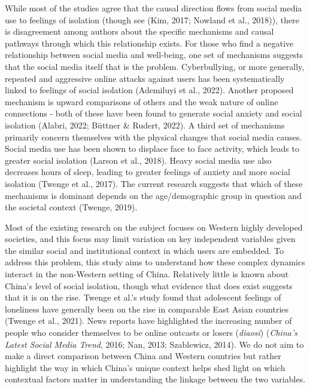 \documentclass[]{interact}
\theoremstyle{plain}%
\theoremstyle{definition}
\theoremstyle{remark}
\begin{document}
While most of the studies agree that the causal direction flows from
social media use to feelings of isolation (though see (Kim, 2017;
Nowland et al., 2018)), there is disagreement among authors about the
specific mechanisms and causal pathways through which this relationship
exists. For those who find a negative relationship between social media
and well-being, one set of mechanisms suggests that the social media
itself that is the problem. Cyberbullying, or more generally, repeated
and aggressive online attacks against users has been systematically
linked to feelings of social isolation (Ademiluyi et al., 2022). Another
proposed mechanism is upward comparisons of others and the weak nature
of online connections - both of these have been found to generate social
anxiety and social isolation (Alabri, 2022; Büttner \& Rudert, 2022). A
third set of mechanisms primarily concern themselves with the physical
changes that social media causes. Social media use has been shown to
displace face to face activity, which leads to greater social isolation
(Larson et al., 2018). Heavy social media use also decreases hours of
sleep, leading to greater feelings of anxiety and more social isolation
(Twenge et al., 2017). The current research suggests that which of these
mechanisms is dominant depends on the age/demographic group in question
and the societal context (Twenge, 2019).

Most of the existing research on the subject focuses on Western highly
developed societies, and this focus may limit variation on key
independent variables given the similar social and institutional context
in which users are embedded. To address this problem, this study aims to
understand how these complex dynamics interact in the non-Western
setting of China. Relatively little is known about China's level of
social isolation, though what evidence that does exist suggests that it
is on the rise. Twenge et al.'s study found that adolescent feelings of
loneliness have generally been on the rise in comparable East Asian
countries (Twenge et al., 2021). News reports have highlighted the
increasing number of people who consider themselves to be online
outcasts or losers (\emph{diaosi}) (\emph{China{'}s Latest Social Media
Trend}, 2016; Nan, 2013; Szablewicz, 2014). We do not aim to make a
direct comparison between China and Western countries but rather
highlight the way in which China's unique context helps shed light on
which contextual factors matter in understanding the linkage between the
two variables.
\end{document}
